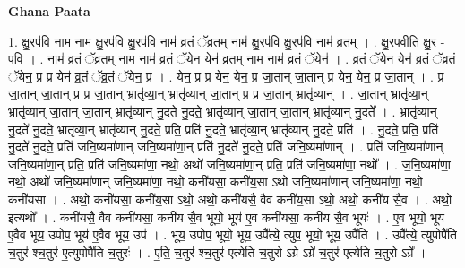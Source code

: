 \documentclass[17pt]{extarticle}
\begin{document}
\textbf{Ghana Paata } \newline

1. क्षु॒रप॑वि॒ नाम॒ नाम॑ क्षु॒रप॑वि क्षु॒रप॑वि॒ नाम॑ व्र॒तं ॅव्र॒तम् नाम॑ क्षु॒रप॑वि क्षु॒रप॑वि॒ नाम॑ व्र॒तम् । . क्षु॒रप॒वीति॑ क्षु॒र - प॒वि॒ । . नाम॑ व्र॒तं ॅव्र॒तम् नाम॒ नाम॑ व्र॒तं ॅयेन॒ येन॑ व्र॒तम् नाम॒ नाम॑ व्र॒तं ॅयेन॑ । . व्र॒तं ॅयेन॒ येन॑ व्र॒तं ॅव्र॒तं ॅयेन॒ प्र प्र येन॑ व्र॒तं ॅव्र॒तं ॅयेन॒ प्र । . येन॒ प्र प्र येन॒ येन॒ प्र जा॒तान् जा॒तान् प्र येन॒ येन॒ प्र जा॒तान् । . प्र जा॒तान् जा॒तान् प्र प्र जा॒तान् भ्रातृ॑व्या॒न् भ्रातृ॑व्यान् जा॒तान् प्र प्र जा॒तान् भ्रातृ॑व्यान् । . जा॒तान् भ्रातृ॑व्या॒न् भ्रातृ॑व्यान् जा॒तान् जा॒तान् भ्रातृ॑व्यान् नु॒दते॑ नु॒दते॒ भ्रातृ॑व्यान् जा॒तान् जा॒तान् भ्रातृ॑व्यान् नु॒दते᳚ । . भ्रातृ॑व्यान् नु॒दते॑ नु॒दते॒ भ्रातृ॑व्या॒न् भ्रातृ॑व्यान् नु॒दते॒ प्रति॒ प्रति॑ नु॒दते॒ भ्रातृ॑व्या॒न् भ्रातृ॑व्यान् नु॒दते॒ प्रति॑ । . नु॒दते॒ प्रति॒ प्रति॑ नु॒दते॑ नु॒दते॒ प्रति॑ जनि॒ष्यमा॑णान् जनि॒ष्यमा॑णा॒न् प्रति॑ नु॒दते॑ नु॒दते॒ प्रति॑ जनि॒ष्यमा॑णान् । . प्रति॑ जनि॒ष्यमा॑णान् जनि॒ष्यमा॑णा॒न् प्रति॒ प्रति॑ जनि॒ष्यमा॑णा॒ नथो॒ अथो॑ जनि॒ष्यमा॑णा॒न् प्रति॒ प्रति॑ जनि॒ष्यमा॑णा॒ नथो᳚ । . ज॒नि॒ष्यमा॑णा॒ नथो॒ अथो॑ जनि॒ष्यमा॑णान् जनि॒ष्यमा॑णा॒ नथो॒ कनी॑यसा॒ कनी॑य॒सा ऽथो॑ जनि॒ष्यमा॑णान् जनि॒ष्यमा॑णा॒ नथो॒ कनी॑यसा । . अथो॒ कनी॑यसा॒ कनी॑य॒सा ऽथो॒ अथो॒ कनी॑यसै॒ वैव कनी॑य॒सा ऽथो॒ अथो॒ कनी॑य सै॒व । . अथो॒ इत्यथो᳚ । . कनी॑यसै॒ वैव कनी॑यसा॒ कनी॑य सै॒व भूयो॒ भूय॑ ए॒व कनी॑यसा॒ कनी॑य सै॒व भूयः॑ । . ए॒व भूयो॒ भूय॑ ए॒वैव भूय॒ उपोप॒ भूय॑ ए॒वैव भूय॒ उप॑ । . भूय॒ उपोप॒ भूयो॒ भूय॒ उपै᳚त्ये॒ त्युप॒ भूयो॒ भूय॒ उपै॑ति । . उपै᳚त्ये॒ त्युपोपै॑ति च॒तुर॑ श्च॒तुर॑ ए॒त्युपोपै॑ति च॒तुरः॑ । . ए॒ति॒ च॒तुर॑ श्च॒तुर॑ एत्येति च॒तुरो ऽग्रे ऽग्रे॑ च॒तुर॑ एत्येति च॒तुरो ऽग्रे᳚ । \newline
\end{document}
